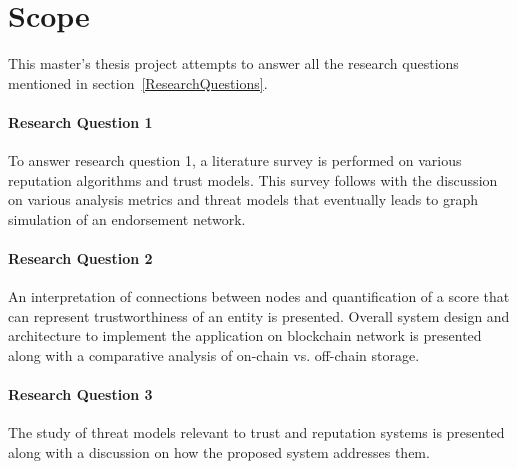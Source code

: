 \section{Scope} 
This master's thesis project attempts to answer all the research questions
mentioned in section~\ref{ResearchQuestions}.  
\paragraph{Research Question 1}
To answer research question 1, a literature survey is performed on various
reputation algorithms and trust models. This survey follows with the discussion
on various analysis metrics and threat models that eventually leads to graph
simulation of an endorsement network.

\paragraph{Research Question 2 } 
An interpretation of connections between nodes and quantification of a score
that can represent trustworthiness of an entity is presented. Overall system
design and architecture to implement the application on blockchain network is
presented along with a comparative analysis of on-chain vs. off-chain storage.  

\paragraph{Research Question 3} 
The study of threat models relevant to trust and reputation systems is
presented along with a discussion on how the proposed system addresses them. 
%


